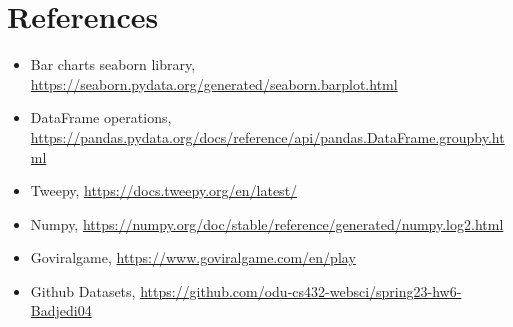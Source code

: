 \documentclass[12pt]{article}
\begin{document}
\clearpage


\section*{References}



\begin{itemize}
    \item {Bar charts seaborn library, \url{https://seaborn.pydata.org/generated/seaborn.barplot.html}}
    \item {DataFrame operations, \url{https://pandas.pydata.org/docs/reference/api/pandas.DataFrame.groupby.html}}
    \item {Tweepy, \url{https://docs.tweepy.org/en/latest/}}
    \item {Numpy, \url{https://numpy.org/doc/stable/reference/generated/numpy.log2.html}}
    \item {Goviralgame, \url{https://www.goviralgame.com/en/play}}
    \item {Github Datasets, \url{https://github.com/odu-cs432-websci/spring23-hw6-Badjedi04}}
    
\end{itemize}
\end{document}
